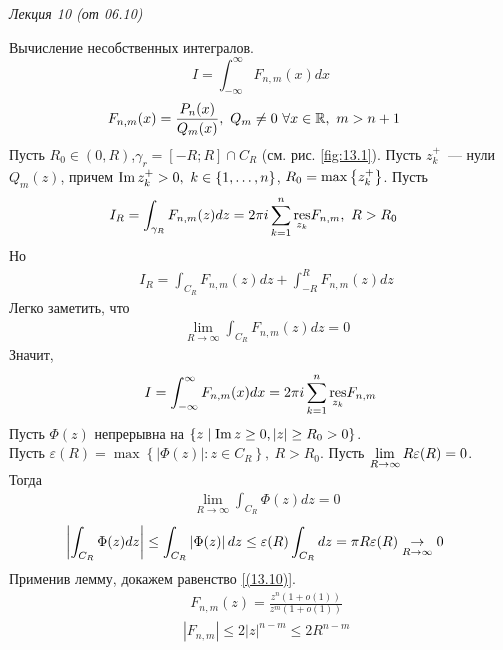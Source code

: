 \begin{flushright}
    \textit{Лекция 10 (от 06.10)}
\end{flushright}
\Example
Вычисление несобственных интегралов.
\begin{equation}\label{(13.9)}
    I = \int_{-\infty}^{\infty}F_{n,m}(x)dx
\end{equation}
\begin{align*}
  & F_{n,m}(x) = \frac{P_n(x)}{Q_m(x)}, \ Q_m \neq 0 \ \forall x \in \mathbb{R}, \ m > n+1
\end{align*}
Пусть $R_0 \in (0, R)$,$\gamma_r = [-R;R]\cap C_R$ (см. рис. \ref{fig:13.1}).
Пусть $z_k^+$~--- нули $Q_m(z)$, причем $\mathrm{Im}\, z_k^+ > 0, \ k \in \{1, \dots,
n\}$, $R_0 = \max \left\{{z_k^+}\right\}$. Пусть
\begin{align*}
  & I_R = \int_{\gamma_R}F_{n,m}(z)dz = 2 \pi i \sum_{k=1}^n\underset{z_k}{\mathrm{res}}F_{n,m}, \ R > R_0
\end{align*}
Но
\begin{align*}
  & I_R = \int_{C_R}F_{n,m}(z)dz + \int_{-R}^RF_{n,m}(z)dz
\end{align*}
Легко заметить, что
\begin{align*}
  & \lim_{R \to \infty} \int_{C_R}F_{n,m}(z)dz = 0
\end{align*}
Значит,
\begin{equation}\label{(13.10)}
    I = \int_{-\infty}^{\infty}F_{n,m}(x)dx = 2 \pi i \sum_{k=1}^n \underset{z_k}{\mathrm{res}} F_{n,m}
\end{equation}
\lemma
Пусть $\Phi(z)$ непрерывна на $\left\{{z \mid \mathrm{Im}\, z \geq 0, \left|{z}\right| \geq R_0 >
  0}\right\}$.
\\
Пусть $\varepsilon(R) = \max \left\{ \left| \Phi(z) \right| : z \in C_R\right\},
\ R > R_0$. Пусть $\displaystyle \lim_{R \to \infty}R\varepsilon(R) = 0$.
\\
Тогда
\begin{align*}
  & \lim_{R \to \infty }\int_{C_R}\Phi(z)dz = 0
\end{align*}
\pr
\begin{align*}
  & \left| \int_{C_R}\Phi(z)dz \right|\leq \int_{C_R}\left| \Phi(z) \right| dz \leq \varepsilon(R) \int_{C_R}dz = \pi R \varepsilon(R) \underset{R \to \infty}{\to} 0
\end{align*}
Применив лемму, докажем равенство \eqref{(13.10)}.
\begin{align*}
  & F_{n,m}(z) = \frac{z^n(1+o(1))}{z^m(1+o(1))}
\end{align*}
\begin{align*}
  & \left| F_{n,m} \right| \leq 2 \left| z \right|^{n-m} \leq 2 R^{n-m}
\end{align*}
